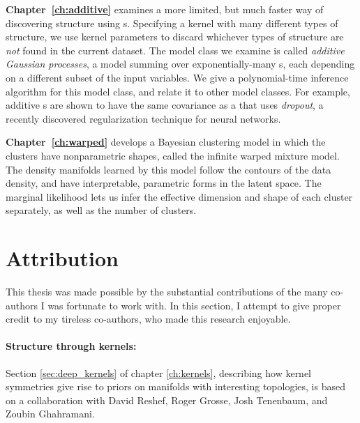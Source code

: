 {\bf Chapter~\ref{ch:additive}} examines a more limited, but much faster way of discovering structure using \gp{}s.
Specifying a kernel with many different types of structure, we use kernel parameters to discard whichever types of structure are \emph{not} found in the current dataset.
The model class we examine is called \emph{additive Gaussian processes}, a model summing over exponentially-many \gp{}s, each depending on a different subset of the input variables.
We give a polynomial-time inference algorithm for this model class, and relate it to other model classes.
For example, additive \gp{}s are shown to have the same covariance as a \gp{} that uses \emph{dropout}, a recently discovered regularization technique for neural networks.

{\bf Chapter~\ref{ch:warped}} develops a Bayesian clustering model in which the clusters have nonparametric shapes, called the infinite warped mixture model.
The density manifolds learned by this model follow the contours of the data density, and have interpretable, parametric forms in the latent space.
The marginal likelihood lets us infer the effective dimension and shape of each cluster separately, as well as the number of clusters.



\iffalse

\section{Attribution}

This thesis was made possible by the substantial contributions of the many co-authors I was fortunate to work with.
In this section, I attempt to give proper credit to my tireless co-authors, who made this research enjoyable.

\paragraph{Structure through kernels:}
Section \ref{sec:deep_kernels} of chapter \ref{ch:kernels}, describing how kernel symmetries give rise to priors on manifolds with interesting topologies, is based on a collaboration with David Reshef, Roger Grosse, Josh Tenenbaum, and Zoubin Ghahramani.


